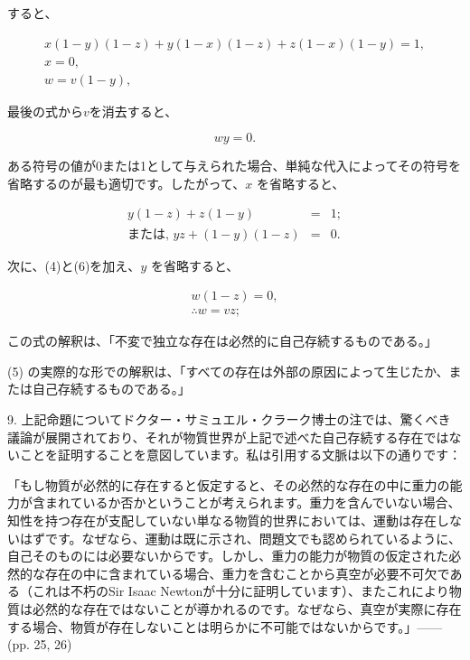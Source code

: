 \documentclass[a4paper,11pt,openany]{ltjsbook}
\begin{document}
すると、

\setcounter{equation}{0}
\begin{eqnarray}
x(1-y)(1-z) + y(1-x)(1-z) + z(1-x)(1-y) = 1, \\ %
x = 0, \\ %
w = v(1-y),  %
\end{eqnarray}

最後の式から$v$を消去すると、

\begin{equation}
wy = 0. %
\end{equation}

ある符号の値が0または1として与えられた場合、単純な代入によってその符号を省略するのが最も適切です。したがって、$x$ を省略すると、

\begin{eqnarray}
y(1-z) + z(1-y) &=& 1; \\ %
\textrm{または, } yz + (1-y)(1-z) &=& 0. %
\end{eqnarray}

次に、(4)と(6)を加え、$y$ を省略すると、

\begin{eqnarray*}
w(1-z) = 0, \\
\therefore w = vz;
\end{eqnarray*}

この式の解釈は、「不変で独立な存在は必然的に自己存続するものである。」

(5) の実際的な形での解釈は、「すべての存在は外部の原因によって生じたか、または自己存続するものである。」

9. 上記命題についてドクター・サミュエル・クラーク博士の注では、驚くべき議論が展開されており、それが物質世界が上記で述べた自己存続する存在ではないことを証明することを意図しています。私は引用する文脈は以下の通りです：

「もし物質が必然的に存在すると仮定すると、その必然的な存在の中に重力の能力が含まれているか否かということが考えられます。重力を含んでいない場合、知性を持つ存在が支配していない単なる物質的世界においては、運動は存在しないはずです。なぜなら、運動は既に示され、問題文でも認められているように、自己そのものには必要ないからです。しかし、重力の能力が物質の仮定された必然的な存在の中に含まれている場合、重力を含むことから真空が必要不可欠である（これは不朽のSir Isaac Newtonが十分に証明しています）、またこれにより物質は必然的な存在ではないことが導かれるのです。なぜなら、真空が実際に存在する場合、物質が存在しないことは明らかに不可能ではないからです。」——(pp. 25, 26)
\end{document}
